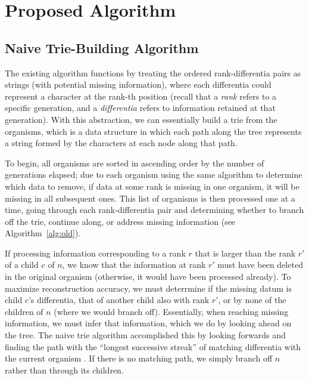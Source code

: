 \section{Proposed Algorithm} \label{sec:algorithm}

\subsection{Naive Trie-Building Algorithm} \label{sec:algorithm:naive}

The existing algorithm functions by treating the ordered rank-differentia pairs as strings (with potential missing information), where each differentia could represent a character at the rank-th position (recall that a \textit{rank} refers to a specific generation, and a \textit{differentia} refers to information retained at that generation).
With this abstraction, we can essentially build a trie \citep{fredkin1960trie} from the organisms, which is a data structure in which each path along the tree represents a string formed by the characters at each node along that path.

To begin, all organisms are sorted in ascending order by the number of generations elapsed; due to each organism using the same algorithm to determine which data to remove, if data at some rank is missing in one organism, it will be missing in all subsequent ones.
This list of organisms is then processed one at a time, going through each rank-differentia pair and determining whether to branch off the trie, continue along, or address missing information (see Algorithm~\ref{alg:old}).



If processing information corresponding to a rank $r$ that is larger than the rank $r'$ of a child $c$ of $n$, we know that the information at rank $r'$ must have been deleted in the original organism (otherwise, it would have been processed already).
To maximize reconstruction accuracy, we must deterrmine if the missing datum is child $c$'s differentia, that of another child also with rank $r'$, or by none of the children of $n$ (where we would branch off).
Essentially, when reaching missing information, we must infer that information, which we do by looking ahead on the tree. The naive  trie algorithm accomplished this by looking forwards and finding the path with the ``longest successive streak'' of matching differentia with the current organism \citep{moreno2024analysis}.
If there is no matching path, we simply branch off $n$ rather than through its children.

